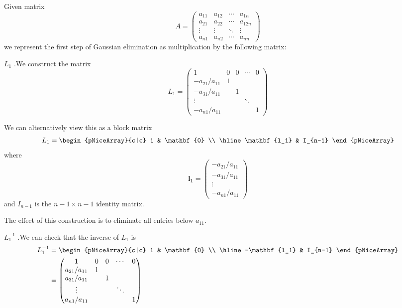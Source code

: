 \documentclass[12pt,letterpaper]{article}
\begin{document}
Given matrix
\begin{equation}
A = \begin{pmatrix}
	a_{11} & a_{12} & \cdots & a_{1n} \\
	a_{21} & a_{22} & \cdots & a_{12n} \\
	\vdots & \vdots & \ddots & \vdots \\
	a_{n1} & a_{n2} & \cdots & a_{nn}
\end{pmatrix}
\end{equation}
we represent the first step of Gaussian elimination as multiplication by the following matrix:
\begin{constr}{$L_1$}
.We construct the matrix
\begin{equation}
L_1 = \begin{pmatrix}
	1 & 0 & 0 & \cdots & 0 \\
	-a_{21}/a_{11} & 1 \\
	-a_{31}/a_{11} & & 1 \\
	\vdots & & & \ddots \\
	-a_{n1}/a_{11} & & & & 1
\end{pmatrix}
\end{equation}

We can alternatively view this as a block matrix
\begin{equation}
L_1 =
\begin{pNiceArray}{c|c}
	1 & \mathbf{0} \\
	\hline
	\mathbf{l_1} & I_{n-1}
\end{pNiceArray}
\end{equation}
where
\begin{equation}
\mathbf{l_1} = \begin{pmatrix}
	-a_{21}/a_{11} \\
	-a_{31}/a_{11} \\
	\vdots \\
	-a_{n1}/a_{11}
\end{pmatrix}
\end{equation}
and $I_{n-1}$ is the $n-1 \times n-1$ identity matrix.
\label{constr:gauss_L1}
\end{constr}

The effect of this construction is to eliminate all entries below $a_{11}$.

\begin{theo}{$L_1^{-1}$}
.We can check that the inverse of $L_1$ is
\begin{align}
L_1^{-1} &= \begin{pNiceArray}{c|c}
	1 & \mathbf{0} \\
	\hline
	-\mathbf{l_1} & I_{n-1}
\end{pNiceArray} \\
&= \begin{pmatrix}
	1 & 0 & 0 & \cdots & 0 \\
	a_{21}/a_{11} & 1 \\
	a_{31}/a_{11} & & 1 \\
	\vdots & & & \ddots \\
	a_{n1}/a_{11} & & & & 1
\end{pmatrix}
\end{align}
\end{theo}
\end{document}
